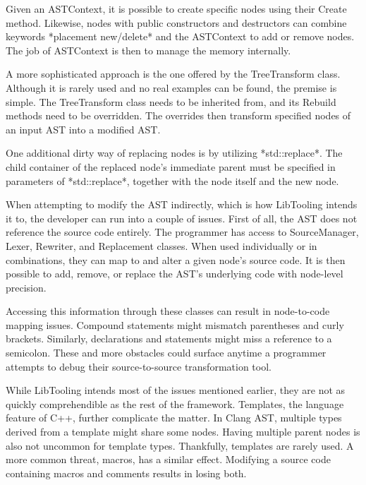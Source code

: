 Given an ASTContext, it is possible to create specific nodes using 
their Create method. 
Likewise, nodes with public constructors and destructors can combine 
keywords *placement new/delete* and the ASTContext to add or remove 
nodes. 
The job of ASTContext is then to manage the memory internally.

A more sophisticated approach is the one offered by the TreeTransform class. 
Although it is rarely used and no real examples can be found, the premise 
is simple. 
The TreeTransform class needs to be inherited from, and its Rebuild methods 
need to be overridden. 
The overrides then transform specified nodes of an input AST 
into a modified AST.

One additional dirty way of replacing nodes is by utilizing *std::replace*. 
The child container of the replaced node's immediate parent must be 
specified in parameters of *std::replace*, together with the node itself 
and the new node.

When attempting to modify the AST indirectly, which is how LibTooling 
intends it to, the developer can run into a couple of issues. 
First of all, the AST does not reference the source code entirely. 
The programmer has access to SourceManager, Lexer, Rewriter, and 
Replacement classes. 
When used individually or in combinations, they can map to and alter 
a given node's source code. 
It is then possible to add, remove, or replace the AST's underlying 
code with node-level precision.

Accessing this information through these classes can result in 
node-to-code mapping issues. 
Compound statements might mismatch parentheses and curly brackets. 
Similarly, declarations and statements might miss a reference to 
a semicolon. 
These and more obstacles could surface anytime a programmer attempts 
to debug their source-to-source transformation tool. 

While LibTooling intends most of the issues mentioned earlier, 
they are not as quickly comprehendible as the rest of the framework. 
Templates, the language feature of C++, further complicate the matter. 
In Clang AST, multiple types derived from a template might share some nodes. 
Having multiple parent nodes is also not uncommon for template types. 
Thankfully, templates are rarely used. 
A more common threat, macros, has a similar effect. 
Modifying a source code containing macros and comments results in 
losing both.
